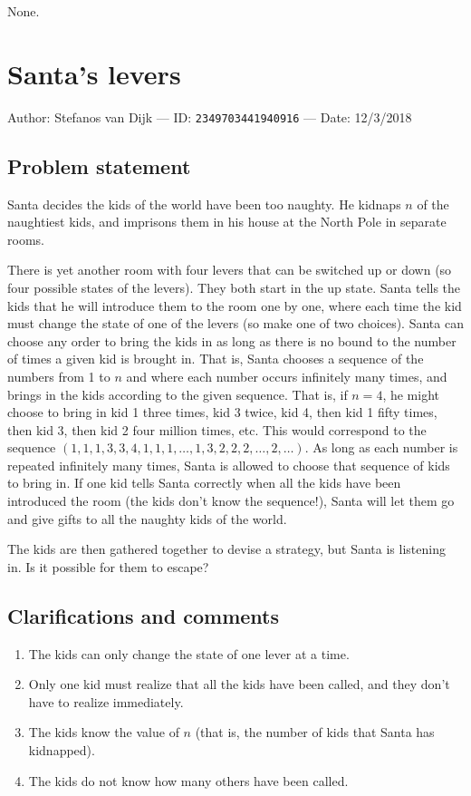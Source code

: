 \documentclass[10pt]{article}
\begin{document}
None.

\pagebreak

\section{Santa's levers}

Author: Stefanos van Dijk --- ID: \verb`2349703441940916` --- Date: 12/3/2018

\subsection{Problem statement}

Santa decides the kids of the world have been too naughty. He kidnaps $n$ of the naughtiest kids, and imprisons them in his house at the North Pole in separate rooms.

There is yet another room with four levers that can be switched up or down (so four possible states of the levers). They both start in the up state. Santa tells the kids that he will introduce them to the room one by one, where each time the kid must change the state of one of the levers (so make one of two choices). Santa can choose any order to bring the kids in as long as there is no bound to the number of times a given kid is brought in. That is, Santa chooses a sequence of the numbers from 1 to $n$ and where each number occurs infinitely many times, and brings in the kids according to the given sequence. That is, if $n=4$, he might choose to bring in kid 1 three times, kid 3 twice, kid 4, then kid 1 fifty times, then kid 3, then kid 2 four million times, etc. This would correspond to the sequence $(1,1,1,3,3,4,1,1,1,\ldots,1,3,2,2,2,\ldots,2,\ldots)$. As long as each number is repeated infinitely many times, Santa is allowed to choose that sequence of kids to bring in. If one kid tells Santa correctly when all the kids have been introduced the room (the kids don't know the sequence!), Santa will let them go and give gifts to all the naughty kids of the world.

The kids are then gathered together to devise a strategy, but Santa is listening in. Is it possible for them to escape?

\subsection{Clarifications and comments}

\begin{enumerate}
  \item The kids can only change the state of one lever at a time.
  \item Only one kid must realize that all the kids have been called, and they don't have to realize immediately.
  \item The kids know the value of $n$ (that is, the number of kids that Santa has kidnapped).
  \item The kids do not know how many others have been called.
\end{enumerate}
\end{document}
